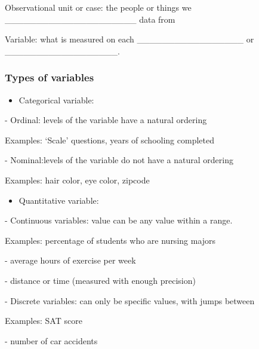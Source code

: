 \documentclass[
]{report}
\providecommand{\tightlist}{%
  \setlength{\itemsep}{0pt}\setlength{\parskip}{0pt}}
\newcommand{\rgi}{\hspace{24pt}}  %
\begin{document}
Observational unit or case: the people or things we \_\_\_\_\_\_\_\_\_\_\_\_\_\_\_\_\_\_\_\_\_ data from

Variable: what is measured on each \_\_\_\_\_\_\_\_\_\_\_\_\_\_\_\_\_ or
\_\_\_\_\_\_\_\_\_\_\_\_\_\_\_\_\_\_.

\hypertarget{types-of-variables}{%
\subsubsection*{Types of variables}\label{types-of-variables}}

\begin{itemize}
\tightlist
\item
  Categorical variable:
\end{itemize}

\vspace{0.5in}


\rgi - Ordinal: levels of the variable have a natural ordering

\rgi \rgi Examples: `Scale' questions, years of schooling completed

\rgi - Nominal:levels of the variable do not have a natural ordering

\rgi \rgi Examples: hair color, eye color, zipcode


\begin{itemize}
\tightlist
\item
  Quantitative variable:
\end{itemize}

\vspace{0.5in}


\rgi - Continuous variables: value can be any value within a range.

\rgi \rgi Examples: percentage of students who are nursing majors

\rgi \rgi \rgi - average hours of exercise per week

\rgi \rgi \rgi - distance or time (measured with enough precision)

\rgi - Discrete variables: can only be specific values, with jumps between

\rgi \rgi Examples: SAT score

\rgi \rgi \rgi - number of car accidents

\newpage
\end{document}
